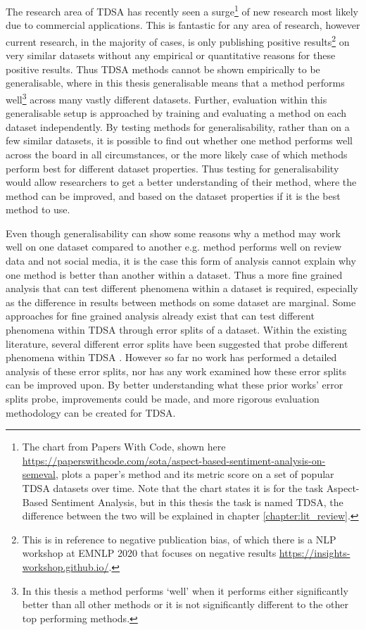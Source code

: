 The research area of TDSA has recently seen a surge\footnote{The chart from Papers With Code, shown here \url{https://paperswithcode.com/sota/aspect-based-sentiment-analysis-on-semeval}, plots a paper's method and its metric score on a set of popular TDSA datasets over time. Note that the chart states it is for the task Aspect-Based Sentiment Analysis, but in this thesis the task is named TDSA, the difference between the two will be explained in chapter \ref{chapter:lit_review}.} of new research most likely due to commercial applications. This is fantastic for any area of research, however current research, in the majority of cases, is only publishing positive results\footnote{This is in reference to negative publication bias, of which there is a NLP workshop at EMNLP 2020 that focuses on negative results \url{https://insights-workshop.github.io/}.} on very similar datasets without any empirical or quantitative reasons for these positive results. Thus TDSA methods cannot be shown empirically to be generalisable, where in this thesis generalisable means that a method performs well\footnote{In this thesis a method performs `well' when it performs either significantly better than all other methods or it is not significantly different to the other top performing methods.} across many vastly different datasets. Further, evaluation within this generalisable setup is approached by training and evaluating a method on each dataset independently. By testing methods for generalisability, rather than on a few similar datasets, it is possible to find out whether one method performs well across the board in all circumstances, or the more likely case of which methods perform best for different dataset properties. Thus testing for generalisability would allow researchers to get a better understanding of their method, where the method can be improved, and based on the dataset properties if it is the best method to use.


Even though generalisability can show some reasons why a method may work well on one dataset compared to another e.g. method performs well on review data and not social media, it is the case this form of analysis cannot explain why one method is better than another within a dataset. Thus a more fine grained analysis that can test different phenomena within a dataset is required, especially as the difference in results between methods on some dataset are marginal. Some approaches for fine grained analysis already exist that can test different phenomena within TDSA through error splits of a dataset. Within the existing literature, several different error splits have been suggested that probe different phenomena within TDSA \citep{nguyen-shirai-2015-phrasernn,wang-etal-2017-tdparse,he-etal-2018-exploiting,yang2018multi}. However so far no work has performed a detailed analysis of these error splits, nor has any work examined how these error splits can be improved upon. By better understanding what these prior works' error splits probe, improvements could be made, and more rigorous evaluation methodology can be created for TDSA.

